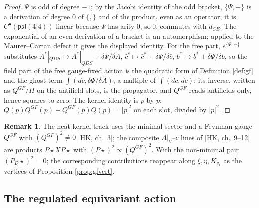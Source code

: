 \documentclass[11pt]{article}
\theoremstyle{definition}
\newtheorem{remark}[definition]{Remark}
\numberwithin{equation}{section}
\begin{document}
\begin{proof}
$\Psi$ is odd of degree $-1$; by the Jacobi identity of the odd bracket, $\{\Psi,-\}$ is a derivation of degree $0$ of $\{,\}$ and of the product, even as an operator; it is $C^\bullet(\mathfrak{psl}(4|4))$-linear because $\Psi$ has arity $0$, so it commutes with $d_{CE}$. The exponential of an even derivation of a bracket is an automorphism; applied to the Maurer--Cartan defect it gives the displayed identity. For the free part, $e^{\{\Psi,-\}}$ substitutes $A^*|_{QDS}\mapsto A^*|_{QDS}+\delta\Psi/\delta A$, $\bar c^*\mapsto\bar c^*+\delta\Psi/\delta\bar c$, $b^*\mapsto b^*+\delta\Psi/\delta b$, so the field part of the free gauge-fixed action is the quadratic form of Definition \ref{def:gf} and the ghost term $\int(dc,\delta\Psi/\delta A)$, a multiple of $\int(dc,d\bar c)$; its inverse, written as $Q^{GF}/H$ on the antifield slots, is the propagator, and $Q^{GF}$ reads antifields only, hence squares to zero. The kernel identity is $p$-by-$p$: $Q(p)Q^{GF}(p)+Q^{GF}(p)Q(p)=|p|^2$ on each slot, divided by $|p|^2$.
\end{proof}

\begin{remark}
The heat-kernel track uses the minimal sector and a Feynman-gauge $Q^{GF}$ with $(Q^{GF})^2\neq0$ [HK, ch.~3]; the composite $A|_V$--$c$ lines of [HK, ch.~9--12] are products $P\star X P\star$ with $(P\star)^2\propto(Q^{GF})^2$. With the non-minimal pair $(P_D\star)^2=0$; the corresponding contributions reappear along $\xi,\eta,K_{v_1}$ as the vertices of Proposition \ref{prop:gfvert}.
\end{remark}

\subsection{The regulated equivariant action}
\end{document}
